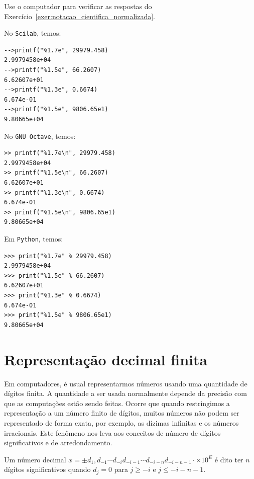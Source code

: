 \begin{exer}
  Use o computador para verificar as respostas do Exercício~\ref{exer:notacao_cientifica_normalizada}.
\end{exer}
\ifisscilab
\begin{resp}
No \verb+Scilab+, temos:
\begin{verbatim}
-->printf("%1.7e", 29979.458)
2.9979458e+04 
-->printf("%1.5e", 66.2607)
6.62607e+01 
-->printf("%1.3e", 0.6674)
6.674e-01 
-->printf("%1.5e", 9806.65e1)
9.80665e+04 
\end{verbatim}
\end{resp}
\fi
\ifisoctave
\begin{resp}
No \verb+GNU Octave+, temos:
\begin{verbatim}
>> printf("%1.7e\n", 29979.458)
2.9979458e+04
>> printf("%1.5e\n", 66.2607)
6.62607e+01
>> printf("%1.3e\n", 0.6674)
6.674e-01
>> printf("%1.5e\n", 9806.65e1)
9.80665e+04
\end{verbatim}
\end{resp}
\fi
\ifispython
\begin{resp}
Em \verb+Python+, temos:
\begin{verbatim}
>>> print("%1.7e" % 29979.458)
2.9979458e+04
>>> print("%1.5e" % 66.2607)
6.62607e+01
>>> print("%1.3e" % 0.6674)
6.674e-01
>>> print("%1.5e" % 9806.65e1)
9.80665e+04
\end{verbatim}
\end{resp}
\fi


\section{Representação decimal finita}

Em computadores, é usual representarmos números usando uma quantidade de dígitos finita. A quantidade a ser usada normalmente depende da precisão com que as computações estão sendo feitas. Ocorre que quando restringimos a representação a um número finito de dígitos, muitos números não podem ser representado de forma exata, por exemplo, as dízimas infinitas e os números irracionais. Este fenômeno nos leva aos conceitos de número de dígitos significativos e de arredondamento.

\begin{defn} Um número decimal $x = \pm d_1,d_{-1}\cdots d_{-i}d_{-i-1}\cdots d_{-i-n} d_{-i-n-1}\cdot \times 10^E$ é dito ter $n$ dígitos significativos quando $d_{j}=0$ para $j\geq -i$ e $j\leq-i-n-1$.  
\end{defn}

